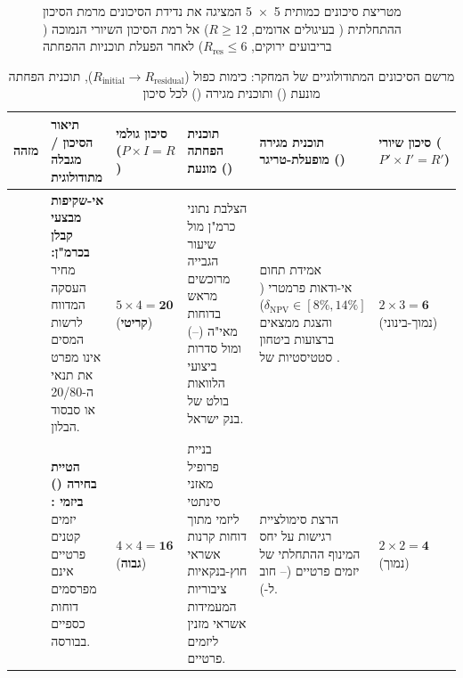 \begin{figure}[htbp]
\begin{english}
\end{english}
\caption{מטריצת סיכונים כמותית \num{5x5} המציגה את נדידת הסיכונים מרמת הסיכון ההתחלתית ( בעיגולים אדומים, $R \ge 12$) אל רמת הסיכון השיורי הנמוכה ( בריבועים ירוקים, $R_{\text{res}} \le 6$) לאחר הפעלת תוכניות ההפחתה \cite{segal2026prep,iso31000}}
\label{fig:risk_matrix_5x5}
\end{figure}

\begin{table}[htbp]
\caption{מרשם הסיכונים המתודולוגיים של המחקר: כימות כפול ($R_{\text{initial}} \to R_{\text{residual}}$), תוכנית הפחתה מונעת () ותוכנית מגירה () לכל סיכון \cite{segal2026prep,iso31000}}
\label{tab:risk_register_mitigation}
\centering
\scriptsize
\renewcommand{\arraystretch}{1.26}
\begin{tabularx}{\textwidth}{R{1.2cm} R{2.4cm} C{1.6cm} Y Y C{1.5cm}}
\toprule
{}
\textbf{מזהה} & \textbf{תיאור הסיכון / מגבלה מתודולוגית} & \textbf{סיכון גולמי ($P \times I = R$)} & \textbf{תוכנית הפחתה מונעת ()} & \textbf{תוכנית מגירה מופעלת-טריגר ()} & \textbf{סיכון שיורי ($P' \times I' = R'$)} \\
\midrule
\textbf{} & \textbf{אי-שקיפות מבצעי קבלן בכרמ"ן:} מחיר העסקה המדווח לרשות המסים אינו מפרט את תנאי ה-\num{20/80} או סבסוד הבלון. & $5 \times 4 = \mathbf{20}$ (\textbf{\color{BrandRed}קריטי}) & הצלבת נתוני כרמ"ן מול שיעור הגבייה מרוכשים מראש בדוחות מאי"ה (--) ומול סדרות ביצועי הלוואות בולט של בנק ישראל. & אמידת תחום אי-ודאות פרמטרי ($\delta_{\text{NPV}} \in [8\%, 14\%]$) והצגת ממצאים ברצועות ביטחון סטטיסטיות של . & $2 \times 3 = \mathbf{6}$ (\color{BrandTeal}נמוך-בינוני) \\
\textbf{} & \textbf{הטיית בחירה () ביזמי :} יזמים קטנים פרטיים אינם מפרסמים דוחות כספיים בבורסה. & $4 \times 4 = \mathbf{16}$ (\textbf{\color{BrandRed}גבוה}) & בניית פרופיל מאזני סינתטי ליזמי  מתוך דוחות קרנות אשראי חוץ-בנקאיות ציבוריות המעמידות אשראי מזנין ליזמים פרטיים. & הרצת סימולציית רגישות על יחס המינוף ההתחלתי של יזמים פרטיים (-- חוב ל-). & $2 \times 2 = \mathbf{4}$ (\color{BrandTeal}נמוך) \\

\end{tabularx}
\end{table}
